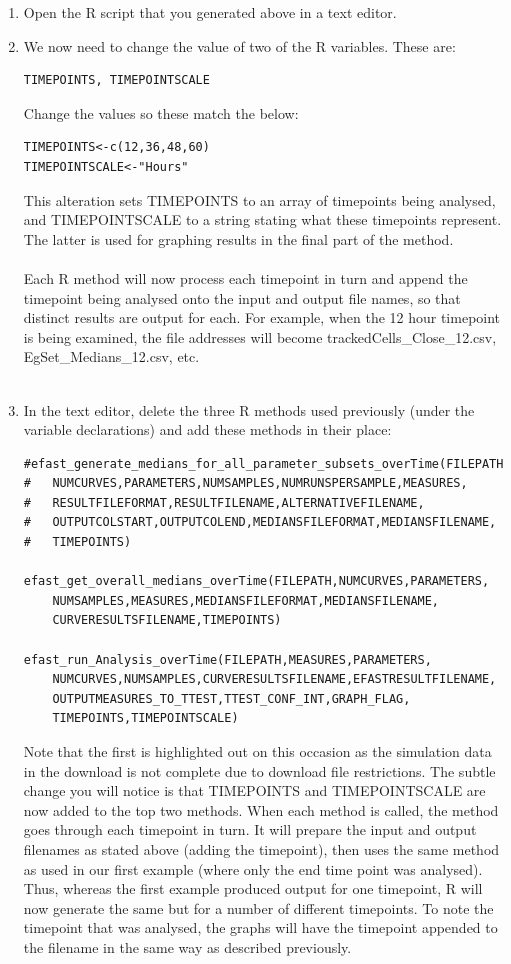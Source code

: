 \documentclass[a4paper,11pt]{article}
\begin{document}
\begin{enumerate}
\item Open the R script that you generated above in a text editor.
\item We now need to change the value of two of the R variables.  These are:
\begin{verbatim}
TIMEPOINTS, TIMEPOINTSCALE
\end{verbatim}
Change the values so these match the below:
\begin{verbatim}
TIMEPOINTS<-c(12,36,48,60)
TIMEPOINTSCALE<-"Hours"
\end{verbatim}

This alteration sets TIMEPOINTS to an array of timepoints being analysed, and TIMEPOINTSCALE to a string stating what these timepoints represent. The latter is used for graphing results in the final part of the method.\\
\\
Each R method will now process each timepoint in turn and append the timepoint being analysed onto the input and output file names, so that distinct results are output for each.  For example, when the 12 hour timepoint is being examined, the file addresses will become trackedCells\_Close\_12.csv, EgSet\_Medians\_12.csv, etc.\\
\\

\item In the text editor, delete the three R methods used previously (under the variable declarations) and add these methods in their place:
\begin{verbatim}
#efast_generate_medians_for_all_parameter_subsets_overTime(FILEPATH,
#	NUMCURVES,PARAMETERS,NUMSAMPLES,NUMRUNSPERSAMPLE,MEASURES,
#	RESULTFILEFORMAT,RESULTFILENAME,ALTERNATIVEFILENAME,
#	OUTPUTCOLSTART,OUTPUTCOLEND,MEDIANSFILEFORMAT,MEDIANSFILENAME,
#	TIMEPOINTS)

efast_get_overall_medians_overTime(FILEPATH,NUMCURVES,PARAMETERS,
	NUMSAMPLES,MEASURES,MEDIANSFILEFORMAT,MEDIANSFILENAME,
	CURVERESULTSFILENAME,TIMEPOINTS)

efast_run_Analysis_overTime(FILEPATH,MEASURES,PARAMETERS,
	NUMCURVES,NUMSAMPLES,CURVERESULTSFILENAME,EFASTRESULTFILENAME,
	OUTPUTMEASURES_TO_TTEST,TTEST_CONF_INT,GRAPH_FLAG,
	TIMEPOINTS,TIMEPOINTSCALE)
\end{verbatim}

Note that the first is highlighted out on this occasion as the simulation data in the download is not complete due to download file restrictions. The subtle change you will notice is that TIMEPOINTS and TIMEPOINTSCALE are now added to the top two methods. When each method is called, the method goes through each timepoint in turn. It will prepare the input and output filenames as stated above (adding the timepoint), then uses the same method as used in our first example (where only the end time point was analysed). Thus, whereas the first example produced output for one timepoint, R will now generate the same but for a number of different timepoints. To note the timepoint that was analysed, the graphs will have the timepoint appended to the filename in the same way as described previously.


\end{enumerate}
\end{document}

